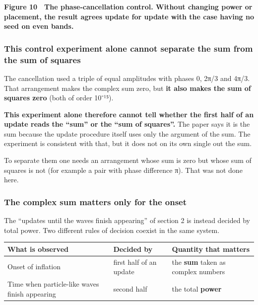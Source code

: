 \documentclass[
]{article}
\newcounter{none} %
\begin{document}
\textbf{Figure 10　The phase-cancellation control. Without changing
power or placement, the result agrees update for update with the case
having no seed on even bands.}

\subsubsection{This control experiment alone cannot separate the sum
from the sum of
squares}\label{this-control-experiment-alone-cannot-separate-the-sum-from-the-sum-of-squares}

The cancellation used a triple of equal amplitudes with phases 0, 2π/3
and 4π/3. That arrangement makes the complex sum zero, but \textbf{it
also makes the sum of squares zero} (both of order 10⁻¹⁵).

\textbf{This experiment alone therefore cannot tell whether the first
half of an update reads the ``sum'' or the ``sum of squares''.} The
paper says it is the sum because the update procedure itself uses only
the argument of the sum. The experiment is consistent with that, but it
does not on its own single out the sum.

To separate them one needs an arrangement whose sum is zero but whose
sum of squares is not (for example a pair with phase difference π). That
was not done here.

\subsubsection{The complex sum matters only for the
onset}\label{the-complex-sum-matters-only-for-the-onset}

The ``updates until the waves finish appearing'' of section 2 is instead
decided by total power. Two different rules of decision coexist in the
same system.

{\def\LTcaptype{none} %
\begin{longtable}[]{@{}
  >{\raggedright\arraybackslash}p{}
  >{\raggedright\arraybackslash}p{}
  >{\raggedright\arraybackslash}p{}@{}}
\toprule\noalign{}
\begin{minipage}[b]{\linewidth}\raggedright
What is observed
\end{minipage} & \begin{minipage}[b]{\linewidth}\raggedright
Decided by
\end{minipage} & \begin{minipage}[b]{\linewidth}\raggedright
Quantity that matters
\end{minipage} \\
\midrule\noalign{}
\endhead
\bottomrule\noalign{}
\endlastfoot
Onset of inflation & first half of an update & the \textbf{sum} taken as
complex numbers \\
Time when particle-like waves finish appearing & second half & the total
\textbf{power} \\
\end{longtable}
}
\end{document}

